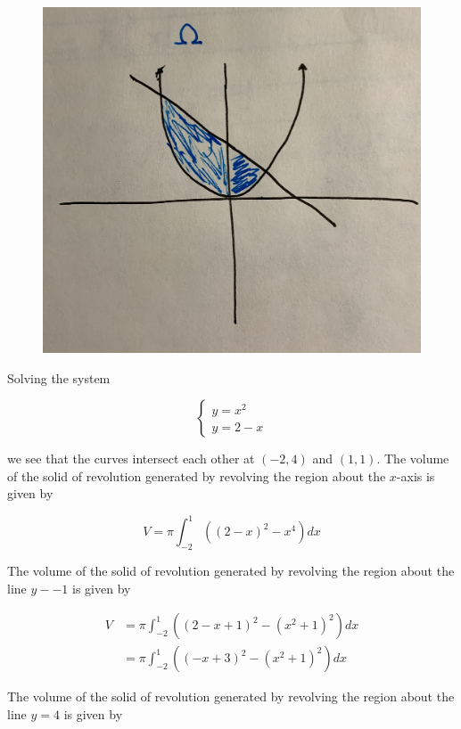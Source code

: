 \documentclass{article}
\begin{document}
    \begin{figure}[hbt!]
        \centering
        \includegraphics[scale=0.05]{omega}
    \end{figure}

    Solving the system

    \[
        \begin{cases}
            y=x^2 \\
            y=2-x
        \end{cases}
    \]

    we see that the curves intersect each other at $(-2,4)$ and $(1,1)$. The volume of the solid of revolution generated by revolving the region about the $x$-axis is given by

    \[
        V = \pi \int_{-2}^1 \left((2-x)^2 - x^4\right)dx
    \]

    The volume of the solid of revolution generated by revolving the region about the line $y--1$ is given by

    \begin{align*}
        V   &= \pi \int_{-2}^1 \left((2-x+1)^2 - (x^2+1)^2\right)dx \\
            &= \pi \int_{-2}^1 \left((-x+3)^2 - (x^2+1)^2\right)dx
    \end{align*}

    \pagebreak
    \thispagestyle{8}

    The volume of the solid of revolution generated by revolving the region about the line $y=4$ is given by
\end{document}
